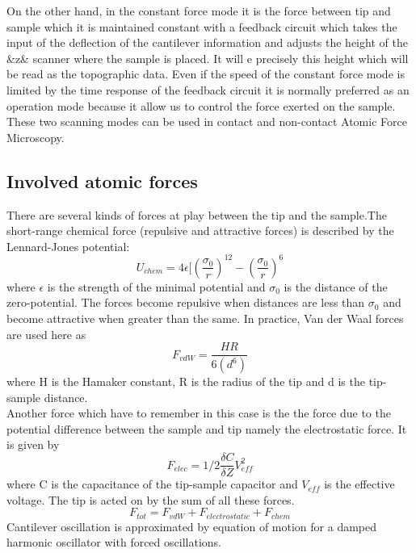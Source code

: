 \documentclass{article}
\begin{document}
On the other hand, in the constant force mode it is the force between tip and sample which it is maintained constant with a feedback circuit which takes the input of the deflection of the cantilever information and adjusts the height of the &z& scanner where the sample is placed. It will e precisely this height which will be read as the topographic data. Even if the speed of the constant force mode is limited by the time response of the feedback circuit it is normally preferred as an operation mode because it allow us to control the force exerted on the sample. These two scanning modes can be used in contact and non-contact Atomic Force Microscopy.

\subsection{Involved atomic forces}
There are several kinds of forces at play between the tip and the sample.The short-range chemical force (repulsive and attractive forces) is described by the Lennard-Jones potential:
\begin{equation}
    U_{chem} = 4 \epsilon[(\frac{\sigma_0}{r})^{12} - (\frac{\sigma_0}{r})^{6}
\end{equation}
where $\epsilon$ is the strength of the minimal potential and $\sigma_{0}$ is the distance of the zero-potential. The forces become repulsive when distances are less than $\sigma_{0}$ and become attractive when greater than the same. In practice, Van der Waal forces are used here as
\begin{equation}
    F_{vdW}= \frac{HR}{6(d^{6})}
\end{equation}
where H is the Hamaker constant, R is the radius of the tip and d is the
tip-sample distance. \\
Another force which have to remember in this case is the the force due to the potential difference between the sample and tip namely the electrostatic force. It is given by
\begin{equation}
    F_{elec}=1/2 \frac{\delta C}{\delta Z}V^{2}_{eff}
\end{equation}
where C is the capacitance of the tip-sample capacitor and $V_{eff}$ is the effective voltage. The tip is acted on by the sum of all these forces.
\begin{equation}
    F_{tot} = F_{vdW} + F_{electrostatic} + F_{chem}
\end{equation}
Cantilever oscillation is approximated by equation of motion for a damped harmonic oscillator with forced oscillations.
\end{document}
